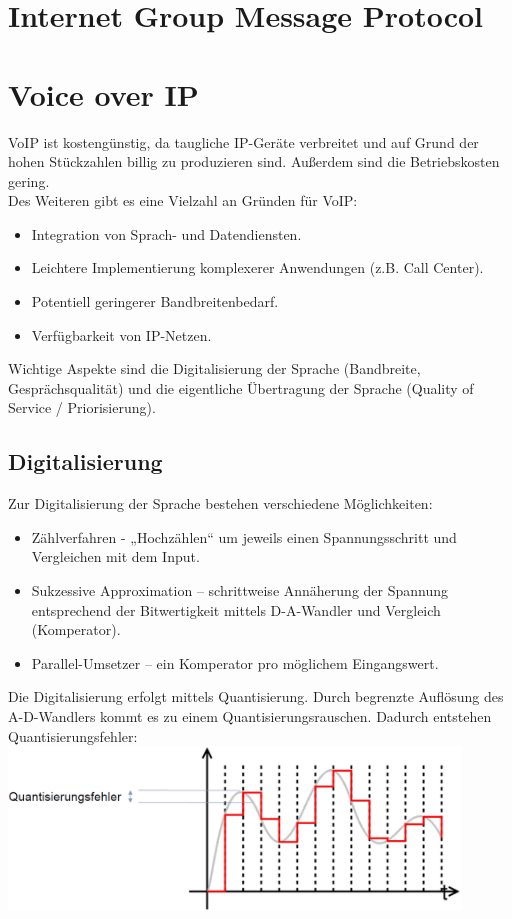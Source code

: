 \documentclass{article} %
\begin{document}
\section{Internet Group Message Protocol}

\section{Voice over IP}
VoIP ist kostengünstig, da taugliche IP-Geräte verbreitet und auf Grund der hohen Stückzahlen billig zu produzieren sind. Außerdem sind die Betriebskosten gering.\\
Des Weiteren gibt es eine Vielzahl an Gründen für VoIP: 
\begin{itemize}
	\item Integration von Sprach- und Datendiensten.
	\item Leichtere Implementierung komplexerer Anwendungen	(z.B. Call Center).
	\item Potentiell geringerer Bandbreitenbedarf.
	\item Verfügbarkeit von IP-Netzen.
\end{itemize}
Wichtige Aspekte sind die Digitalisierung der Sprache (Bandbreite, Gesprächsqualität) und die eigentliche Übertragung der Sprache (Quality of Service / Priorisierung).
\subsection{Digitalisierung}
Zur Digitalisierung der Sprache bestehen verschiedene Möglichkeiten:
\begin{itemize}
	\item Zählverfahren - „Hochzählen“ um jeweils einen Spannungsschritt und Vergleichen mit dem Input.
	\item Sukzessive Approximation – schrittweise Annäherung der Spannung entsprechend der Bitwertigkeit mittels D-A-Wandler	und Vergleich (Komperator).
	\item Parallel-Umsetzer – ein Komperator pro möglichem	Eingangswert.	
\end{itemize}
Die Digitalisierung erfolgt mittels Quantisierung. Durch begrenzte Auflösung des A-D-Wandlers kommt es zu einem Quantisierungsrauschen. Dadurch entstehen Quantisierungsfehler:\\
\includegraphics[width=12cm]{img/quantisierungsfehler.png}
\end{document}
